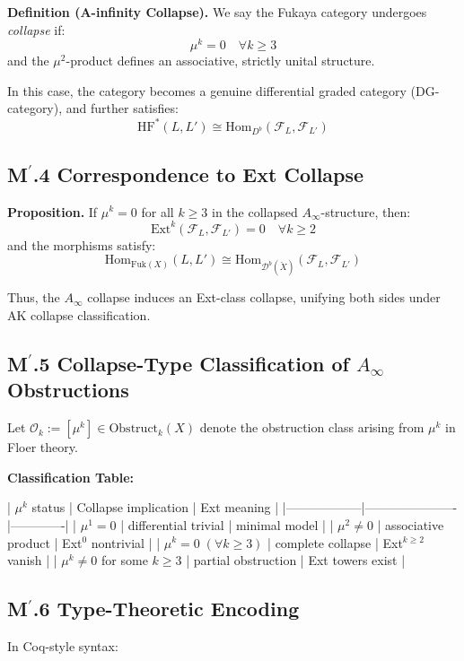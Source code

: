 \documentclass[11pt]{article}
\begin{document}
\begin{axiom}
\begin{axiom}
{{\textbf{Definition (A-infinity Collapse).}  
We say the Fukaya category undergoes \textit{collapse} if:
\[
\mu^k = 0 \quad \forall k \geq 3
\]
and the \( \mu^2 \)-product defines an associative, strictly unital structure.

In this case, the category becomes a genuine differential graded category (DG-category), and further satisfies:
\[
\mathrm{HF}^*(L, L') \cong \mathrm{Hom}_{D^b}(\mathcal{F}_L, \mathcal{F}_{L'})
\]

\subsection*{M$^\prime$.4 Correspondence to Ext Collapse}

\textbf{Proposition.}  
If \( \mu^k = 0 \) for all \( k \geq 3 \) in the collapsed \( A_\infty \)-structure, then:
\[
\mathrm{Ext}^k(\mathcal{F}_L, \mathcal{F}_{L'}) = 0 \quad \forall k \geq 2
\]
and the morphisms satisfy:
\[
\mathrm{Hom}_{\mathrm{Fuk}(X)}(L, L') \cong \mathrm{Hom}_{\mathcal{D}^b(\check{X})}(\mathcal{F}_L, \mathcal{F}_{L'})
\]

Thus, the \( A_\infty \) collapse induces an Ext-class collapse, unifying both sides under AK collapse classification.

\subsection*{M$^\prime$.5 Collapse-Type Classification of $A_\infty$ Obstructions}

Let \( \mathcal{O}_k := [\mu^k] \in \mathrm{Obstruct}_k(X) \) denote the obstruction class arising from \( \mu^k \) in Floer theory.

\textbf{Classification Table:}

| \( \mu^k \) status | Collapse implication | Ext meaning |
|------------------|----------------------|-------------|
| \( \mu^1 = 0 \) | differential trivial | minimal model |
| \( \mu^2 \neq 0 \) | associative product | Ext$^0$ nontrivial |
| \( \mu^k = 0\; (\forall k \geq 3) \) | complete collapse | Ext$^{k \geq 2}$ vanish |
| \( \mu^k \neq 0 \) for some \( k \geq 3 \) | partial obstruction | Ext towers exist |

\subsection*{M$^\prime$.6 Type-Theoretic Encoding}

In Coq-style syntax:

}}
\end{axiom}
\end{axiom}
\end{document}
